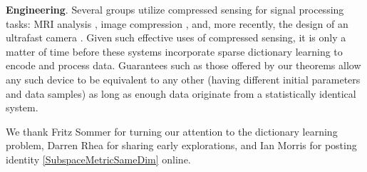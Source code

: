 \documentclass[journal, twocolumn]{IEEEtran}
\begin{document}

\textbf{Engineering}.
Several groups utilize compressed sensing for signal processing tasks: MRI analysis \cite{lustig2008compressed},  image compression \cite{Duarte08}, and, more recently, the design of an ultrafast camera \cite{Gao14}. Given such effective uses of compressed sensing, it is only a matter of time before these systems incorporate sparse dictionary learning to encode and process data. Guarantees such as those offered by our theorems allow any such device to be equivalent to any other (having different initial parameters and data samples) as long as enough data originate from a statistically identical system.


We thank Fritz Sommer for turning our attention to the dictionary learning problem, Darren Rhea for sharing early explorations, and Ian Morris for posting identity \eqref{SubspaceMetricSameDim} online.  







\end{document}
